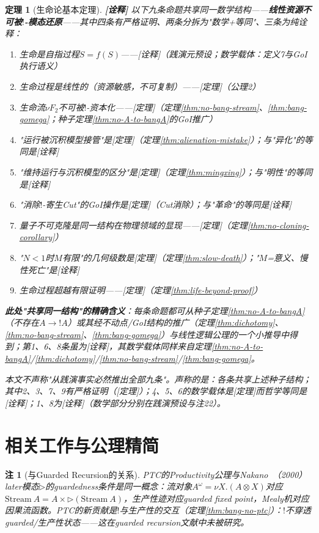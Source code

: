 \documentclass[11pt,a4paper]{article}
\newtheorem{theorem}{定理}
\newtheorem{remark}{注}
\newcommand{\lvl}[1]{\hfill\textbf{\footnotesize[#1]}}
\newcommand{\lvI}{\lvl{诠释}}
\newcommand{\bang}{{!}}
\newcommand{\tensor}{\otimes}
\begin{document}
\begin{theorem}[生命论基本定理]\label{thm:fundamental}\lvI
以下九条命题共享同一数学结构——\textbf{线性资源不可被$\bang$-模态还原}——其中四条有严格证明、两条分拆为"数学+等同"、三条为纯诠释：
\begin{enumerate}
\item 生命是自指过程$S=f(S)$——[诠释]（践演元预设；数学载体：定义7与GoI执行语义）
\item 生命过程是线性的（资源敏感，不可复制）——[定理]（公理2）
\item 生命流$\nu F_2$不可被$\bang$-资本化——[定理]（定理\ref{thm:no-bang-stream}、\ref{thm:bang-gomega}；种子定理\ref{thm:no-A-to-bangA}的GoI推广）
\item "运行被沉积模型接管"是[定理]（定理\ref{thm:alienation-mistake}）；与"异化"的等同是[诠释]
\item "维持运行与沉积模型的区分"是[定理]（定理\ref{thm:mingxing}）；与"明性"的等同是[诠释]
\item "消除$\bang$-寄生Cut"的GoI操作是[定理]（Cut消除）；与"革命"的等同是[诠释]
\item 量子不可克隆是同一结构在物理领域的显现——[定理]（定理\ref{thm:no-cloning-corollary}）
\item "$N<1$时$M$有限"的几何级数是[定理]（定理\ref{thm:slow-death}）；"$M$=意义、慢性死亡"是[诠释]
\item 生命过程超越有限证明——[定理]（定理\ref{thm:life-beyond-proof}）
\end{enumerate}

\textbf{此处"共享同一结构"的精确含义}：每条命题都可从种子定理\ref{thm:no-A-to-bangA}（不存在$A\to\bang A$）或其经不动点/GoI结构的推广（定理\ref{thm:dichotomy}、\ref{thm:no-bang-stream}、\ref{thm:bang-gomega}）与线性逻辑公理的一个小推导中得到；第1、6、8条虽为[诠释]，其数学载体同样来自定理\ref{thm:no-A-to-bangA}/\ref{thm:dichotomy}/\ref{thm:no-bang-stream}/\ref{thm:bang-gomega}。

本文不声称"从践演事实必然推出全部九条"。声称的是：各条共享上述种子结构；其中2、3、7、9有严格证明（[定理]）；4、5、6的数学载体是[定理]而哲学等同是[诠释]；1、8为[诠释]（数学部分分别在践演预设与注22）。
\end{theorem}

\section{相关工作与公理精简}

\begin{remark}[与Guarded Recursion的关系]
PTC的Productivity公理与Nakano~\cite{nakano00}（2000）later模态$\rhd$的guardedness条件是同一概念：流对象$A^\omega=\nu X.(A\tensor X)$对应$\mathrm{Stream}\ A=A\times\rhd(\mathrm{Stream}\ A)$，生产性迹对应guarded fixed point，Mealy机对应因果流函数。PTC的新贡献是$\bang$与生产性的交互（定理\ref{thm:bang-no-ptc}）：$\bang$不穿透guarded/生产性状态——这在guarded recursion文献中未被研究。
\end{remark}
\end{document}
